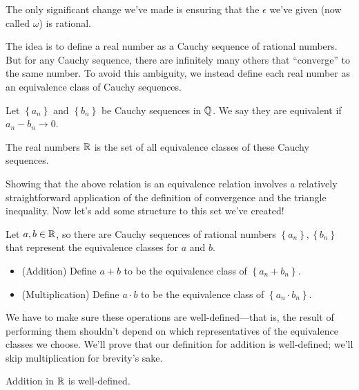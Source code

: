 \documentclass[../m131main.tex]{subfiles}
\begin{document}
The only significant change we've made is ensuring that the $\epsilon$ we've given (now called $\omega$) is rational.

The idea is to define a real number as a Cauchy sequence of rational numbers.
But for any Cauchy sequence, there are infinitely many others that ``converge'' to the same number.
To avoid this ambiguity, we instead define each real number as an equivalence class of Cauchy sequences.

\begin{definition}
    Let $\left\{ a_n \right\}$ and $\left\{ b_n \right\}$ be Cauchy sequences in $\mathbb{Q}$.
    We say they are equivalent if $a_n - b_n \to 0$.

    The real numbers $\mathbb{R}$ is the set of all equivalence classes of these Cauchy sequences.
\end{definition}

Showing that the above relation is an equivalence relation involves a relatively straightforward application of the definition of convergence and the triangle inequality.
Now let's add some structure to this set we've created!

\begin{definition}
    Let $a,b \in \mathbb{R}$, so there are Cauchy sequences of rational numbers $\left\{ a_n \right\}, \left\{ b_n \right\}$ that represent the equivalence classes for $a$ and $b$.
    \begin{itemize}
        \item (Addition)
        Define $a+b$ to be the equivalence class of $\left\{ a_n + b_n \right\}$.
        \item (Multiplication)
        Define $a \cdot b$ to be the equivalence class of $\left\{ a_n \cdot b_n \right\}$.
    \end{itemize}
\end{definition}

We have to make sure these operations are well-defined---that is, the result of performing them shouldn't depend on which representatives of the equivalence classes we choose.
We'll prove that our definition for addition is well-defined; we'll skip multiplication for brevity's sake.

\begin{theorem}
    Addition in $\mathbb{R}$ is well-defined.
\end{theorem}
\end{document}
